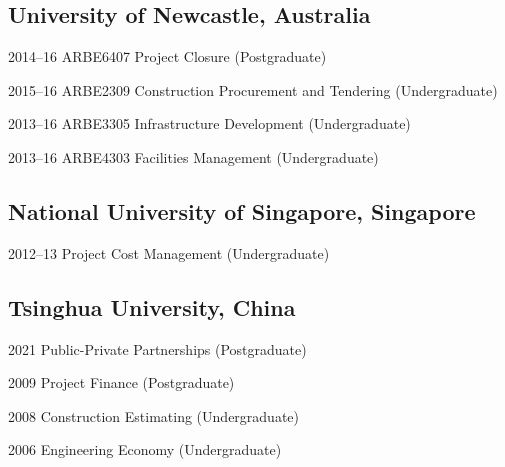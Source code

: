 \documentclass[11pt,a4paper]{report} %
\begin{document}
    \subsection*{University of Newcastle, Australia}

    \begin{tablist}

        \item[2014--16] \tab{}ARBE6407 Project Closure (Postgraduate)
        
        \item[2015--16] \tab{}ARBE2309 Construction Procurement and Tendering (Undergraduate)

        \item[2013--16] \tab{}ARBE3305 Infrastructure Development (Undergraduate)

        \item[2013--16] \tab{}ARBE4303 Facilities Management (Undergraduate)
        
    \end{tablist}

    \subsection*{National University of Singapore, Singapore}

    \begin{tablist}
        
        \item[2012--13] \tab{}Project Cost Management (Undergraduate)
        
    \end{tablist}

    \subsection*{Tsinghua University, China}

    \begin{tablist}

        \item[2021] \tab{}Public-Private Partnerships (Postgraduate)
        
        \item[2009] \tab{}Project Finance  (Postgraduate)

        \item[2008] \tab{}Construction Estimating (Undergraduate)

        \item[2006] \tab{}Engineering Economy (Undergraduate)
        
    \end{tablist}
\end{document}
